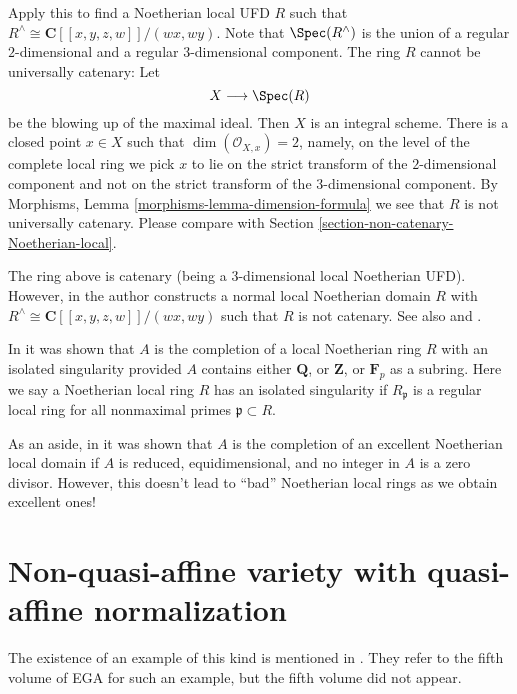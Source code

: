 \medskip\noindent
Apply this to find a Noetherian local UFD $R$ such that
$R^\wedge \cong \mathbf{C}[[x, y, z, w]]/(wx, wy)$.
Note that $\Spec(R^\wedge)$ is the
union of a regular $2$-dimensional and a regular $3$-dimensional component.
The ring $R$ cannot be universally catenary: Let
$$
X \longrightarrow \Spec(R)
$$
be the blowing up of the maximal ideal. Then $X$ is an integral scheme.
There is a closed point $x \in X$ such that $\dim(\mathcal{O}_{X, x}) = 2$,
namely, on the level of the complete local ring we pick $x$ to lie on the
strict transform of the $2$-dimensional component and not on the strict
transform of the $3$-dimensional component. By
Morphisms, Lemma \ref{morphisms-lemma-dimension-formula}
we see that $R$ is not universally catenary. Please compare with
Section \ref{section-non-catenary-Noetherian-local}.

\medskip\noindent
The ring above is catenary (being a $3$-dimensional local Noetherian UFD).
However, in \cite{Ogoma-example} the author constructs a normal local
Noetherian domain $R$ with $R^\wedge \cong \mathbf{C}[[x, y, z, w]]/(wx, wy)$
such that $R$ is not catenary. See also \cite{Heitmann-Ogoma} and
\cite{Lech-YAPO}.

\medskip\noindent
In \cite{Heitmann-isolated} it was shown that $A$ is the completion
of a local Noetherian ring $R$ with an isolated singularity
provided $A$ contains either $\mathbf{Q}$, or $\mathbf{Z}$, or
$\mathbf{F}_p$ as a subring. Here we say a Noetherian local ring $R$
has an isolated singularity if $R_\mathfrak p$ is
a regular local ring for all nonmaximal primes $\mathfrak p \subset R$.

\medskip\noindent
As an aside, in \cite{Loepp} it was shown that $A$ is the completion of an
excellent Noetherian local domain if $A$ is reduced, equidimensional,
and no integer in $A$ is a zero divisor. However, this doesn't lead
to ``bad'' Noetherian local rings as we obtain excellent ones!





\section{Non-quasi-affine variety with quasi-affine normalization}
\label{section-nonquasi-affine}

\noindent
The existence of an example of this kind is mentioned in
\cite[II Remark 6.6.13]{EGA}. They refer to the fifth volume of
EGA for such an example, but the fifth volume did not appear.

